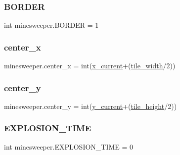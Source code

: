 \subsubsection{\texorpdfstring{BORDER}{BORDER}}
{\footnotesize\ttfamily int minesweeper.\+B\+O\+R\+D\+ER = 1}

\mbox{\label{namespaceminesweeper_a9f77150ad90d6a98a617936ba74f1064}} 
\subsubsection{\texorpdfstring{center\_x}{center\_x}}
{\footnotesize\ttfamily minesweeper.\+center\+\_\+x = int(\mbox{\hyperlink{namespaceminesweeper_a28942e4d6e641ff5809c76fa7d9a8ac7}{x\+\_\+current}}+(\mbox{\hyperlink{namespaceminesweeper_a528cb94bc9f0e9a64f2923e0414591ed}{tile\+\_\+width}}/2))}

\mbox{\label{namespaceminesweeper_ab52733b88daedc140eaa8e04678318c5}} 
\subsubsection{\texorpdfstring{center\_y}{center\_y}}
{\footnotesize\ttfamily minesweeper.\+center\+\_\+y = int(\mbox{\hyperlink{namespaceminesweeper_ad3bd8e814d4008f5bfd13e994479b5e4}{y\+\_\+current}}+(\mbox{\hyperlink{namespaceminesweeper_a033197bb6aa4149287e9c4fcdeff7d96}{tile\+\_\+height}}/2))}

\mbox{\label{namespaceminesweeper_a910d256576fdcee42c40cf536a4d7418}} 
\subsubsection{\texorpdfstring{EXPLOSION\_TIME}{EXPLOSION\_TIME}}
{\footnotesize\ttfamily int minesweeper.\+E\+X\+P\+L\+O\+S\+I\+O\+N\+\_\+\+T\+I\+ME = 0}

\mbox{\label{namespaceminesweeper_a9958c61bcddc97972e42fc95a835576c}} 
